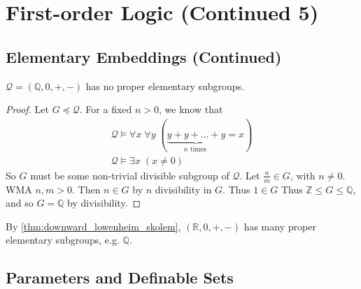 \documentclass[notoc,notitlepage]{tufte-book}
\begin{document}
\section{First-order Logic (Continued 5)}%
\label{sec:first_order_logic_continued_5}

\subsection{Elementary Embeddings (Continued)}%
\label{sub:elementary_embeddings_continued}

\begin{eg}
  $\mathcal{Q} = (\mathbb{Q}, 0, +, -)$ has no proper elementary subgroups.
\end{eg}

\begin{proof}
  Let $G \preceq \mathcal{Q}$. For a fixed $n > 0$, we know that
  \begin{gather*}
    \mathcal{Q} \models \forall x \; \forall y \; ( \underbrace{y + y + \hdots + y}_{n \text{ times }} = x ) \\
    \mathcal{Q} \models \exists x \; ( x \neq 0 )
  \end{gather*}
  So $G$ must be some non-trivial divisible subgroup of $\mathcal{Q}$. Let $\frac{n}{m} \in G$, with $n \neq 0$. WMA $n, m > 0$. Then $n \in G$ by $n$ divisibility in $G$. Thus $1 \in G$ Thus $\mathbb{Z} \leq G \leq \mathbb{Q}$, and so $G = \mathbb{Q}$ by divisibility.
\end{proof}

\begin{remark}
  By \cref{thm:downward_lowenheim_skolem}, $(\mathbb{R}, 0, +, -)$ has many proper elementary subgroups, e.g. $\mathbb{Q}$.
\end{remark}


\subsection{Parameters and Definable Sets}%
\label{sub:parameters_and_definable_sets}
\end{document}
